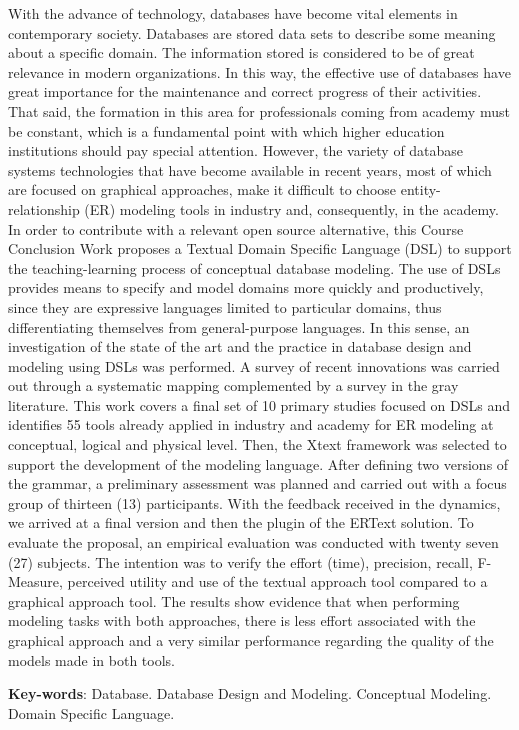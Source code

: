 \begin{resumo}[Abstract]
With the advance of technology, databases have become vital elements in contemporary society.
Databases are stored data sets to describe some meaning about a specific domain.
The information stored is considered to be of great relevance in modern organizations.
In this way, the effective use of databases have great importance for the maintenance and correct progress of their activities.
That said, the formation in this area for professionals coming from academy must be constant, which is a fundamental point with which higher education institutions should pay special attention.
However, the variety of database systems technologies that have become available in recent years, most of which are focused on graphical approaches, make it difficult to choose entity-relationship (ER) modeling tools in industry and, consequently, in the academy.
In order to contribute with a relevant open source alternative, this Course Conclusion Work proposes a Textual Domain Specific Language (DSL) to support the teaching-learning process of conceptual database modeling.
The use of DSLs provides means to specify and model domains more quickly and productively, since they are expressive languages limited to particular domains, thus differentiating themselves from general-purpose languages.
In this sense, an investigation of the state of the art and the practice in database design and modeling using DSLs was performed.
A survey of recent innovations was carried out through a systematic mapping complemented by a survey in the gray literature.
This work covers a final set of 10 primary studies focused on DSLs and identifies 55 tools already applied in industry and academy for ER modeling at conceptual, logical and physical level.
Then, the Xtext framework was selected to support the development of the modeling language.
After defining two versions of the grammar, a preliminary assessment was planned and carried out with a focus group of thirteen (13) participants.
With the feedback received in the dynamics, we arrived at a final version and then the plugin of the ERText solution.
To evaluate the proposal, an empirical evaluation was conducted with twenty seven (27) subjects.
The intention was to verify the effort (time), precision, recall, F-Measure, perceived utility and use of the textual approach tool compared to a graphical approach tool.
The results show evidence that when performing modeling tasks with both approaches, there is less effort associated with the graphical approach and a very similar performance regarding the quality of the models made in both tools.

\vspace{\onelineskip}

 \noindent 
 \textbf{Key-words}: Database. Database Design and Modeling. Conceptual Modeling. Domain Specific Language.
\end{resumo}
